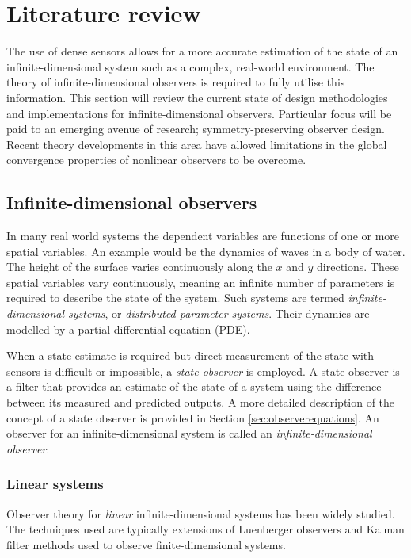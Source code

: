 \section{Literature review} \label{sec:literature}
The use of dense sensors allows for a more accurate estimation of the state of an infinite-dimensional system such as a complex, real-world environment. The theory of infinite-dimensional observers is required to fully utilise this information. This section will review the current state of design methodologies and implementations for infinite-dimensional observers. Particular focus will be paid to an emerging avenue of research; symmetry-preserving observer design. Recent theory developments in this area have allowed limitations in the global convergence properties of nonlinear observers to be overcome.

\subsection{Infinite-dimensional observers}
In many real world systems the dependent variables are functions of one or more spatial variables. An example would be the dynamics of waves in a body of water. The height of the surface varies continuously along the $x$ and $y$ directions. These spatial variables vary continuously, meaning an infinite number of parameters is required to describe the state of the system. Such systems are termed \textit{infinite-dimensional systems}, or \textit{distributed parameter systems}. Their dynamics are modelled by a partial differential equation (PDE). 

When a state estimate is required but direct measurement of the state with sensors is difficult or impossible, a \textit{state observer} is employed. A state observer is a filter that provides an estimate of the state of a system using the difference between its measured and predicted outputs. A more detailed description of the concept of a state observer is provided in Section \ref{sec:observerequations}. An observer for an infinite-dimensional system is called an \textit{infinite-dimensional observer}.

\subsubsection{Linear systems}
Observer theory for \textit{linear} infinite-dimensional systems has been widely studied. The techniques used are typically extensions of Luenberger observers and Kalman filter methods used to observe finite-dimensional systems.


